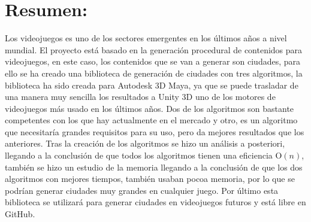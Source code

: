 %
%

\section*{Resumen:}

Los videojuegos es uno de los sectores emergentes en los últimos años a nivel mundial. El proyecto está basado en la generación procedural de contenidos para videojuegos, en este caso, los contenidos que se van a generar son ciudades, para ello se ha creado una biblioteca de generación de ciudades con tres algoritmos, la biblioteca ha sido creada para Autodesk 3D Maya, ya que se puede trasladar de una manera muy sencilla los resultados a Unity 3D uno de los motores de videojuegos más usado en los últimos años. Dos de los algoritmos son bastante competentes con los que hay actualmente en el mercado y otro, es un algoritmo que necesitaría grandes requisitos para su uso, pero da mejores resultados que los anteriores. Tras la creación de los algoritmos se hizo un análisis a posteriori, llegando a la conclusión de que todos los algoritmos tienen una eficiencia O$(n)$, también se hizo un estudio de la memoria llegando a la conclusión de que los dos algoritmos con mejores tiempos, también usaban pocoa memoria, por lo que se podrían generar ciudades muy grandes en cualquier juego. Por último esta biblioteca se utilizará para generar ciudades en videojuegos futuros y está libre en GitHub.